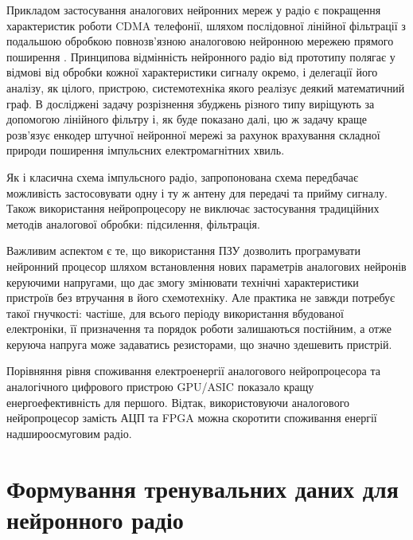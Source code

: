 Прикладом застосування аналогових нейронних мереж у радіо є покращення 
характеристик роботи CDMA телефонії, шляхом послідовної лінійної фільтрації
з подальшою обробкою повнозв'язною аналоговою нейронною мережею прямого 
поширення \cite{imp:Hasan2017}. Принципова відмінність нейронного
радіо від прототипу полягає у відмові від обробки кожної характеристики 
сигналу окремо, і делегації його аналізу, як цілого, пристрою, системотехніка 
якого реалізує деякий математичний граф. В досліджені \cite{imp:Zhang2009} 
задачу розрізнення збуджень різного типу виріщують за допомогою лінійного 
фільтру і, як буде показано далі, цю ж задачу краще розв'язує енкодер штучної 
нейронної мережі за рахунок врахування складної природи поширення імпульсних 
електромагнітних хвиль.

Як і класична схема імпульсного радіо, запропонована схема передбачає 
можливість застосовувати одну і ту ж антену для передачі та прийму сигналу. 
Також використання нейропроцесору не виключає застосування традиційних 
методів аналогової обробки: підсилення, фільтрація.

Важливим аспектом є те, що використання ПЗУ дозволить програмувати нейронний 
процесор шляхом встановлення нових параметрів аналогових нейронів керуючими 
напругами, що дає змогу змінювати технічні характеристики пристроїв без 
втручання в його схемотехніку. Але практика не завжди потребує такої 
гнучкості: частіше, для всього періоду використання вбудованої електроніки, 
її призначення та порядок роботи залишаються постійним, а отже керуюча 
напруга може задаватись резисторами, що значно здешевить пристрій.

Порівняння рівня споживання електроенергії аналогового нейропроцесора та 
аналогічного цифрового пристрою GPU/ASIC \cite{imp:AnalogLSTM} показало 
кращу енергоефективність для першого. Відтак, використовуючи аналогового 
нейропроцесор замість АЦП та FPGA можна скоротити споживання енергії 
надшироосмуговим радіо.

\section{Формування тренувальних даних для нейронного радіо}

